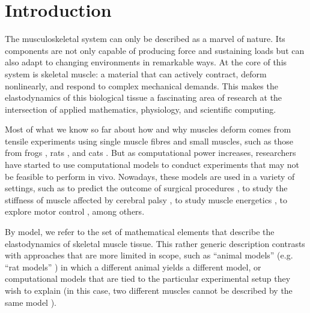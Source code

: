 \documentclass{sfuthesis}
\numberwithin{equation}{section}
\numberwithin{figure}{chapter}
\numberwithin{table}{chapter}
\theoremstyle{definition}
\begin{document}
%
\hypersetup{linkbordercolor=black,hidelinks}
\tableofcontents%
\clearpage

%
\listoftables%
\clearpage

%
\listoffigures%
\clearpage





%
%

\mainmatter%

\chapter{Introduction}

The musculoskeletal system can only be described as a marvel of nature. Its components are not only capable of producing force and sustaining loads but can also adapt to changing environments in remarkable ways. At the core of this system is skeletal muscle: a material that can actively contract, deform nonlinearly, and respond to complex mechanical demands. This makes the elastodynamics of this biological tissue a fascinating area of research at the intersection of applied mathematics, physiology, and scientific computing.

Most of what we know so far about how and why muscles deform comes from tensile experiments using single muscle fibres \cite{Hill1938} and small muscles, such as those from frogs \cite{GordonHuxleyJulian1966,Huxley1957}, 
rats \cite{GillespieEtAl1987}, and cats \cite{RackWestbury1969}. 
But as computational power increases, researchers have started to use computational models to conduct experiments that may not be feasible to perform in vivo. 
Nowadays, these models are used in a variety of settings, such as to predict the outcome of surgical procedures \cite{TigueEtAl2022}, to study the stiffness of muscle affected by cerebral palsy \cite{KonnoEtAl2022_CP}, to study muscle energetics \cite{Paper1_WakelingEtAl2020}, to explore motor control \cite{WalterEtAl2014}, among others.

By model, we refer to the set of mathematical elements that describe the elastodynamics of skeletal muscle tissue.
This rather generic description contrasts with approaches that are more limited in scope, such as ``animal models'' (e.g. ``rat models'' \cite{Passipieri2017,Wu2012}) in which a different animal yields a different model, or computational models that are tied to the particular experimental setup they wish to explain (in this case, two different muscles cannot be described by the same model \cite{Caillet2023,ValeroCuevas2009}).
\end{document}
